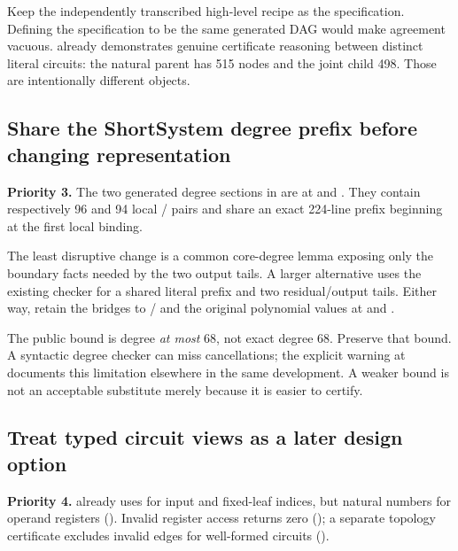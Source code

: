 Keep the independently transcribed high-level recipe as the specification.
Defining the specification to be the same generated DAG would make agreement
vacuous.  already demonstrates genuine certificate
reasoning between distinct literal circuits: the natural parent has 515
nodes and the joint child 498. Those are intentionally different objects.

\subsection{Share the ShortSystem degree prefix before changing representation}
\label{sec:shortdegree}

\textbf{Priority 3.} The two generated degree sections in
 are at  and
. They contain respectively 96 and 94
local / pairs and share an exact 224-line prefix
beginning at the first local binding.

The least disruptive change is a common core-degree lemma exposing only
the boundary facts needed by the two output tails. A larger alternative uses
the existing  checker for a shared literal prefix
and two residual/output tails. Either way, retain the bridges to
/ and the original polynomial
values at  and
.

The public bound is degree \emph{at most} 68, not exact degree 68. Preserve
that bound. A syntactic degree checker can miss cancellations; the explicit
warning at  documents this limitation
elsewhere in the same development. A weaker bound is not an acceptable
substitute merely because it is easier to certify.

\subsection{Treat typed circuit views as a later design option}

\textbf{Priority 4.}  already uses  for
input and fixed-leaf indices, but natural numbers for operand registers
(). Invalid register access returns zero
(); a separate topology certificate excludes
invalid edges for well-formed circuits
().

